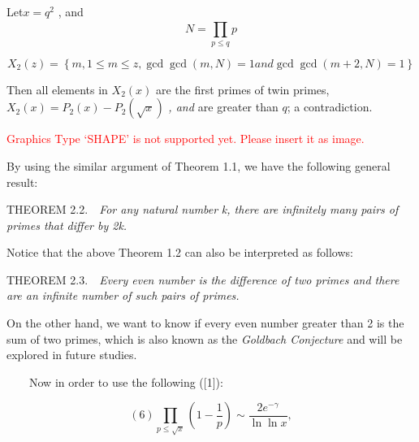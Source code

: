 \documentclass{aomart}
\begin{document}
\begin{center}
Let\(    x = q^{2}\) ,  and \textit{ { \\ }}\begin{equation}
N = \prod_{p\leq q}^{}p
\end{equation}

\end{center}


\begin{equation}
X_{2}\left(z\right) =\left\{  m,  1\leq m\leq z,  \gcd \gcd \left(m,N\right)  = 1  and \gcd \gcd \left(m+2,N\right)  = 1\right\} 
\end{equation}

\vspace{1\baselineskip}

Then all elements in \( X_{2}\left(x\right)\) are the first primes of twin primes,  \( X_{2}\left(x\right) = P_{2}\left(x\right)- P_{2}\left(\sqrt{x}\right)\)\textit{ {,  } {and }}are greater than \( q\); a contradiction. \ \ 

\vspace{1\baselineskip}

\textcolor{red}{Graphics Type `SHAPE' is not supported yet. Please insert it as image.}\par


By using the similar argument of Theorem 1.1, we have the following general result:
\vspace{1\baselineskip}

THEOREM  2.2.\ \ \textit{For any natural number} \textit{k, there are infinitely many pairs of primes that differ by 2k.}

Notice that the above Theorem 1.2 can also be interpreted as follows: 
\vspace{1\baselineskip}

THEOREM  2.3.\ \ \textit{Every even number is the difference of two primes and there are an infinite number of such pairs of primes.\textcolor[HTML]{FFFFFF}{ }}

On the other hand, we want to know if every even number greater than 2 is the sum of two primes, which is also known as the \textit{Goldbach Conjecture} and will be explored in future studies. 

\vspace{1\baselineskip}

 \ \ \ \ Now in order to use the following ([1]):

\begin{equation}
 (6)                                    \prod_{p\leq\sqrt{x}}^{}(1-\frac{1}{p} ) \sim  \frac{2e^{-\gamma }}{\ln \ln  x } ,
\end{equation}
\end{document}
